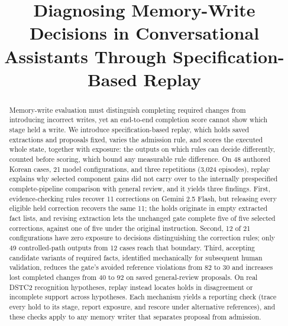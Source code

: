 \documentclass[acmsmall,review,anonymous]{acmart}
\title[Diagnosing Memory-Write Decisions]{Diagnosing Memory-Write Decisions in Conversational Assistants Through Specification-Based Replay}
\newcommand{\reviewfooter}{\fancyfoot{}\fancyfoot[C]{\footnotesize\thepage}}
\begin{document}
\begin{abstract}
Memory-write evaluation must distinguish completing required changes from introducing incorrect writes, yet an end-to-end completion score cannot show which stage held a write. We introduce specification-based replay, which holds saved extractions and proposals fixed, varies the admission rule, and scores the executed whole state, together with exposure: the outputs on which rules can decide differently, counted before scoring, which bound any measurable rule difference. On 48 authored Korean cases, 21 model configurations, and three repetitions (3,024 episodes), replay explains why selected component gains did not carry over to the internally prespecified complete-pipeline comparison with general review, and it yields three findings. First, evidence-checking rules recover 11 corrections on Gemini 2.5 Flash, but releasing every eligible held correction recovers the same 11; the holds originate in empty extracted fact lists, and revising extraction lets the unchanged gate complete five of five selected corrections, against one of five under the original instruction. Second, 12 of 21 configurations have zero exposure to decisions distinguishing the correction rules; only 49 controlled-path outputs from 12 cases reach that boundary. Third, accepting candidate variants of required facts, identified mechanically for subsequent human validation, reduces the gate's avoided reference violations from 82 to 30 and increases lost completed changes from 40 to 92 on saved general-review proposals. On real DSTC2 recognition hypotheses, replay instead locates holds in disagreement or incomplete support across hypotheses. Each mechanism yields a reporting check (trace every hold to its stage, report exposure, and rescore under alternative references), and these checks apply to any memory writer that separates proposal from admission.
\end{abstract}
\maketitle\reviewfooter
\end{document}
